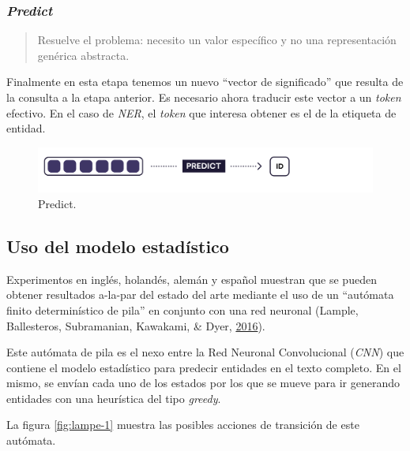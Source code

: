 \documentclass[12pt,a4paper,]{scrartcl}
\begin{document}
\hypertarget{predict}{%
\subsubsection{\texorpdfstring{\emph{Predict}}{Predict}}\label{predict}}

\begin{quote}
Resuelve el problema: necesito un valor específico y no una representación genérica abstracta.
\end{quote}

Finalmente en esta etapa tenemos un nuevo \enquote{vector de significado} que resulta de la consulta a la etapa anterior. Es necesario ahora traducir este vector a un \emph{token} efectivo. En el caso de \emph{NER}, el \emph{token} que interesa obtener es el de la etiqueta de entidad.

\begin{figure}[H]

{\centering \includegraphics{assets/deep-learning-formula-nlp_predict.pdf} 

}

\caption{Predict.}\label{fig:formula-predict}
\end{figure}

\hypertarget{use-of-cnn}{%
\subsection{Uso del modelo estadístico}\label{use-of-cnn}}

Experimentos en inglés, holandés, alemán y español muestran que se pueden obtener resultados a-la-par del estado del arte mediante el uso de un \enquote{autómata finito determinístico de pila} en conjunto con una red neuronal (Lample, Ballesteros, Subramanian, Kawakami, \& Dyer, \protect\hyperlink{ref-DBLP:journalsux2fcorrux2fLampleBSKD16}{2016}).

Este autómata de pila es el nexo entre la Red Neuronal Convolucional (\emph{CNN}) que contiene el modelo estadístico para predecir entidades en el texto completo. En el mismo, se envían cada uno de los estados por los que se mueve para ir generando entidades con una heurística del tipo \emph{greedy}.

La figura \ref{fig:lampe-1} muestra las posibles acciones de transición de este autómata.
\end{document}
